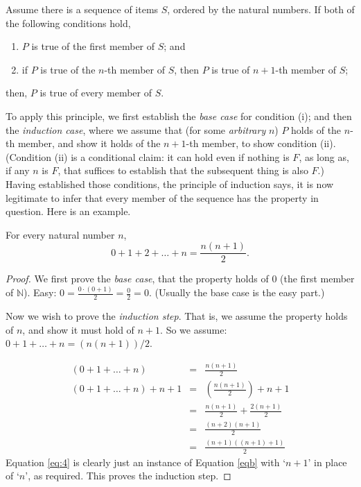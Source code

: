  \begin{definition}
 Assume there is a sequence of items $S$, ordered by the natural numbers. If both of the following conditions hold, \begin{enumerate}
   \item $P$ is true of the first
    member of $S$; and 
    \item  if $P$
    is true of the $n$-th member of $S$, then $P$ is true of $n+1$-th member of $S$;
 \end{enumerate} then, $P$ is true of every member of $S$.\end{definition}

To apply this principle, we first establish the \emph{base case} for condition (i); and then the \emph{induction case}, where we assume that (for some \emph{arbitrary} $n$) $P$ holds of the $n$-th member, and show it holds of the $n+1$-th member, to show condition (ii). (Condition (ii) is a conditional claim: it can hold even if nothing is $F$, as long as, if any $n$ is $F$, that suffices to establish that the subsequent thing is also $F$.) Having established those conditions, the principle of induction says, it is now legitimate to infer that every member of the sequence has the property in question. Here is an example.

\begin{theorem} For every natural number $n$, 
\begin{equation}0+1+2+\ldots+n = \frac{n(n+1)}{2}. \label{eqb}
\end{equation}

\begin{proof}
	We first prove the {\em base case}, that the
	property holds of $0$ (the first member of $\mathbb{N}$). Easy: $0 = \frac{0\cdot(0+1)}{2} = \frac{0}{2} = 0$. (Usually the base case is the easy part.)

	Now we wish to prove the {\em induction step}. That is, we assume the 
	property holds of $n$, and show it must hold of $n+1$. So we assume:
	$0+1+\ldots+n = (n(n+1))/2$.
  
\begin{eqnarray}
 (0+1+\ldots+n) & = & \frac{n(n+1)}{2}\\
    (0+1+\ldots+n)+n+1 & = & \left(\frac{n(n+1)}{2}\right) + n+1
    \label{eq:1}  \\
      & = & \frac{n(n+1)}{2} + \frac{2(n+1)}{2}
    \label{eq:2}  \\
      & = & \frac{(n+2)(n+1)}{2}
    \label{eq:3}  \\
      & = & \frac{(n+1)((n+1)+1)}{2}
    \label{eq:4}
\end{eqnarray} Equation \eqref{eq:4} is clearly just an instance of
Equation \eqref{eqb} with `$n+1$' in place of `$n$', as required. This
proves the induction step. \end{proof} \end{theorem} 





